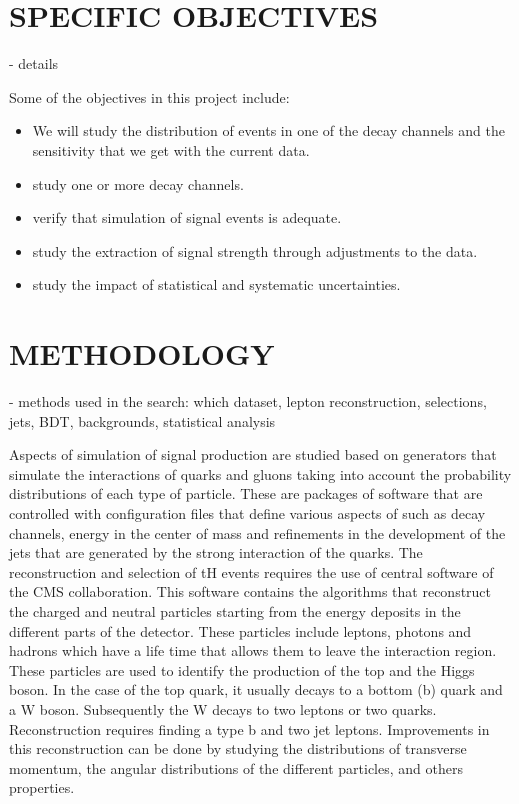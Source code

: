 \documentclass[final,3p]{CSP}
\begin{document}
\section{SPECIFIC OBJECTIVES}
- details 

Some of the objectives in this project include:
\begin{itemize}
\item We will study the distribution of events in one of the decay channels and the  sensitivity that we get with the current data.
\item study one or more decay channels.
\item verify that simulation of signal events is adequate.
\item study the extraction of signal strength through adjustments to the data.
\item study the impact of statistical and systematic uncertainties.
\end{itemize}



\section{METHODOLOGY}
- methods used in the search: which dataset,  lepton reconstruction, selections, jets, BDT, backgrounds, statistical analysis

Aspects of simulation of signal production are studied based on generators that simulate the 
interactions of quarks and gluons taking into account the probability distributions of each 
type of particle. These are packages of software that are controlled with configuration files 
that define various aspects of such as decay channels, energy in the center of mass and 
refinements in the development of the jets that are generated by the strong interaction of 
the quarks. The reconstruction and selection of tH events requires the use of central 
software of the CMS collaboration. This software contains the algorithms that reconstruct the 
charged and neutral particles starting from the energy deposits in the different parts of the 
detector. These particles include leptons, photons and hadrons which have a life time that 
allows them to leave the interaction region. These particles are used to identify the 
production of the top and the Higgs boson. In the case of the top quark, it usually decays to 
a bottom (b) quark and a W boson. Subsequently the W decays to two leptons or two quarks. 
Reconstruction requires finding a type b and two jet leptons. Improvements in this 
reconstruction can be done by studying the distributions of transverse momentum, the angular 
distributions of the different particles, and others properties.
\end{document}

